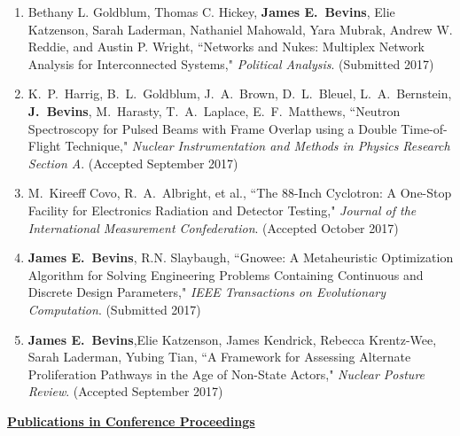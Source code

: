 \begin{enumerate}
  
  \item Bethany L. Goldblum, Thomas C. Hickey, \textbf{James E.\ Bevins}, Elie Katzenson, Sarah Laderman, Nathaniel Mahowald, Yara Mubrak, Andrew W. Reddie, and Austin P. Wright, ``Networks and Nukes: Multiplex Network Analysis for Interconnected Systems," \textit{Political Analysis}. (Submitted 2017)

  \item K.\ P.\ Harrig, B.\ L.\ Goldblum, J.\ A.\ Brown, D.\ L.\ Bleuel, L.\ A.\ Bernstein, \textbf{J.\ Bevins}, M.\ Harasty, T.\ A.\ Laplace, E.\ F.\ Matthews, ``Neutron Spectroscopy for Pulsed Beams with Frame Overlap using a Double Time-of-Flight Technique," \textit{Nuclear Instrumentation and Methods in Physics Research Section A}. (Accepted September 2017)
  
  \item M.\ Kireeff Covo, R.\ A.\ Albright, et al., ``The 88-Inch Cyclotron: A One-Stop Facility for Electronics Radiation and Detector Testing," \textit{Journal of the International Measurement Confederation}. (Accepted October 2017)

  \item \textbf{James E.\ Bevins}, R.N. Slaybaugh, ``Gnowee: A Metaheuristic Optimization Algorithm for Solving Engineering Problems Containing Continuous and Discrete Design Parameters," \textit{IEEE Transactions on Evolutionary Computation}. (Submitted 2017)
  
  \item \textbf{James E.\ Bevins},Elie Katzenson, James Kendrick, Rebecca Krentz-Wee, Sarah Laderman, Yubing Tian, ``A Framework for Assessing Alternate Proliferation Pathways in the Age of Non-State Actors," \textit{Nuclear Posture Review}. (Accepted September 2017)
\end{enumerate}


\underline{\textbf{Publications in Conference Proceedings}}

